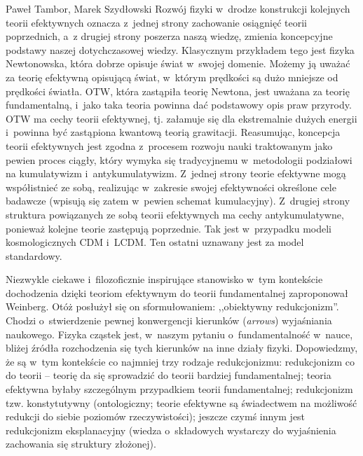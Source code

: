\begin{artplenv}{Paweł Tambor, Marek Szydłowski}
Rozwój fizyki w~drodze konstrukcji kolejnych teorii efektywnych oznacza z~jednej strony zachowanie osiągnięć teorii poprzednich, a~z drugiej strony poszerza naszą wiedzę, zmienia koncepcyjne podstawy naszej dotychczasowej wiedzy. Klasycznym przykładem tego jest fizyka Newtonowska, która dobrze opisuje świat w~swojej domenie. Możemy ją uważać za teorię efektywną opisującą świat, w~którym prędkości są dużo mniejsze od prędkości światła. OTW, która zastąpiła teorię Newtona, jest uważana za teorię fundamentalną, i~jako taka teoria powinna dać podstawowy opis praw przyrody. OTW ma cechy teorii efektywnej, tj. załamuje się dla ekstremalnie dużych energii i~powinna być zastąpiona kwantową teorią grawitacji. Reasumując, koncepcja teorii efektywnych jest zgodna z~procesem rozwoju nauki traktowanym jako pewien proces ciągły, który wymyka się tradycyjnemu w~metodologii podziałowi na kumulatywizm i~antykumulatywizm. Z~jednej strony teorie efektywne mogą współistnieć ze sobą, realizując w~zakresie swojej efektywności określone cele badawcze (wpisują się zatem w~pewien schemat kumulacyjny). Z~drugiej strony struktura powiązanych ze sobą teorii efektywnych ma cechy antykumulatywne, ponieważ kolejne teorie zastępują poprzednie. Tak jest w~przypadku modeli kosmologicznych CDM i~LCDM. Ten ostatni uznawany jest za model standardowy.

Niezwykle ciekawe i~filozoficznie inspirujące stanowisko w~tym kontekście dochodzenia dzięki teoriom efektywnym do teorii fundamentalnej zaproponował Weinberg. Otóż posłużył się on sformułowaniem: ,,obiektywny redukcjonizm''. Chodzi o~stwierdzenie pewnej konwergencji kierunków (\textit{arrows}) wyjaśniania naukowego. Fizyka cząstek jest, w~naszym pytaniu o~fundamentalność w~nauce, bliżej źródła rozchodzenia się tych kierunków na inne działy fizyki. Dopowiedzmy, że są w~tym kontekście co najmniej trzy rodzaje redukcjonizmu: redukcjonizm co do teorii -- teorię da się sprowadzić do teorii bardziej fundamentalnej; teoria efektywna byłaby szczególnym przypadkiem teorii fundamentalnej; redukcjonizm tzw. konstytutywny (ontologiczny; teorie efektywne są świadectwem na możliwość redukcji do siebie poziomów rzeczywistości); jeszcze czymś innym jest redukcjonizm eksplanacyjny (wiedza o~składowych wystarczy do wyjaśnienia zachowania się struktury złożonej).


\end{artplenv}
